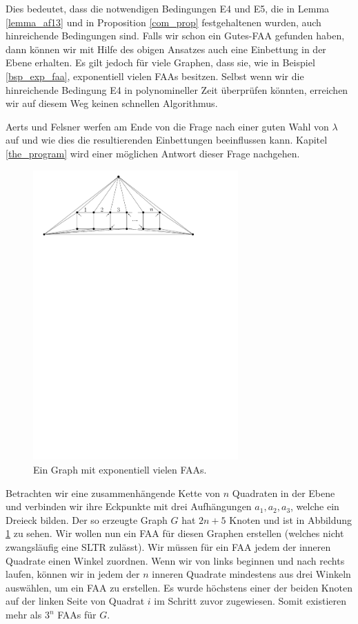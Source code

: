 \begin{remark}
Dies bedeutet, dass die notwendigen Bedingungen E4 und E5, die in Lemma \ref{lemma_af13} und in Proposition \ref{com_prop} festgehaltenen wurden, auch hinreichende Bedingungen sind. Falls wir schon ein Gutes-FAA gefunden haben, dann können wir mit Hilfe des obigen Ansatzes auch eine Einbettung in der Ebene erhalten. Es gilt jedoch für viele Graphen, dass sie, wie in Beispiel \ref{bsp_exp_faa}, exponentiell vielen FAAs besitzen. Selbst wenn wir die hinreichende Bedingung E4 in polynomineller Zeit überprüfen könnten, erreichen wir auf diesem Weg keinen schnellen Algorithmus.
\end{remark}

Aerts und Felsner werfen am Ende von \cite{af13} die Frage nach einer guten Wahl von $\lambda$ auf und wie dies die resultierenden Einbettungen beeinflussen kann. Kapitel \ref{the_program} wird einer möglichen Antwort dieser Frage nachgehen.

\begin{figure}
	\centering
  \includegraphics[width=0.7\textwidth]{exp_faa.pdf}
  \caption{Ein Graph mit exponentiell vielen FAAs.}
  \label{exp_faa}
\end{figure}

\begin{example}\label{bsp_exp_faa}
Betrachten wir eine zusammenhängende Kette von $n$ Quadraten in der Ebene und verbinden wir ihre Eckpunkte mit drei Aufhängungen $a_1,a_2,a_3$, welche ein Dreieck bilden. Der so erzeugte Graph $G$ hat $2n+5$ Knoten und ist in Abbildung \ref{exp_faa} zu sehen. Wir wollen nun ein FAA für diesen Graphen erstellen (welches nicht zwangsläufig eine SLTR zulässt). Wir müssen für ein FAA jedem der inneren Quadrate einen Winkel zuordnen. Wenn wir von links beginnen und nach rechts laufen, können wir in jedem der $n$ inneren Quadrate mindestens aus drei Winkeln auswählen, um ein FAA zu erstellen. Es wurde höchstens einer der beiden Knoten auf der linken Seite von Quadrat $i$ im Schritt zuvor zugewiesen. Somit existieren mehr als $3^n$ FAAs für $G.$
\end{example}

